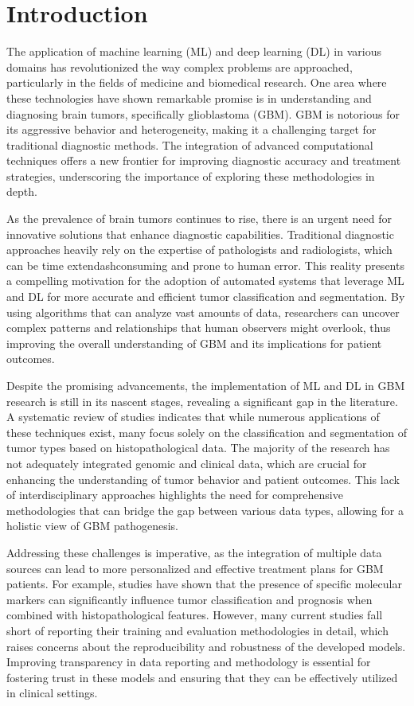 \documentclass[runningheads]{llncs}
\begin{document}
\section{Introduction}
The application of machine learning (ML) and deep learning (DL) in various domains has revolutionized the way complex problems are approached, particularly in the fields of medicine and biomedical research. One area where these technologies have shown remarkable promise is in understanding and diagnosing brain tumors, specifically glioblastoma (GBM). GBM is notorious for its aggressive behavior and heterogeneity, making it a challenging target for traditional diagnostic methods. The integration of advanced computational techniques offers a new frontier for improving diagnostic accuracy and treatment strategies, underscoring the importance of exploring these methodologies in depth.

As the prevalence of brain tumors continues to rise, there is an urgent need for innovative solutions that enhance diagnostic capabilities. Traditional diagnostic approaches heavily rely on the expertise of pathologists and radiologists, which can be time	extendash{}consuming and prone to human error. This reality presents a compelling motivation for the adoption of automated systems that leverage ML and DL for more accurate and efficient tumor classification and segmentation. By using algorithms that can analyze vast amounts of data, researchers can uncover complex patterns and relationships that human observers might overlook, thus improving the overall understanding of GBM and its implications for patient outcomes.

Despite the promising advancements, the implementation of ML and DL in GBM research is still in its nascent stages, revealing a significant gap in the literature. A systematic review of studies indicates that while numerous applications of these techniques exist, many focus solely on the classification and segmentation of tumor types based on histopathological data. The majority of the research has not adequately integrated genomic and clinical data, which are crucial for enhancing the understanding of tumor behavior and patient outcomes. This lack of interdisciplinary approaches highlights the need for comprehensive methodologies that can bridge the gap between various data types, allowing for a holistic view of GBM pathogenesis.

Addressing these challenges is imperative, as the integration of multiple data sources can lead to more personalized and effective treatment plans for GBM patients. For example, studies have shown that the presence of specific molecular markers can significantly influence tumor classification and prognosis when combined with histopathological features. However, many current studies fall short of reporting their training and evaluation methodologies in detail, which raises concerns about the reproducibility and robustness of the developed models. Improving transparency in data reporting and methodology is essential for fostering trust in these models and ensuring that they can be effectively utilized in clinical settings.
\end{document}
